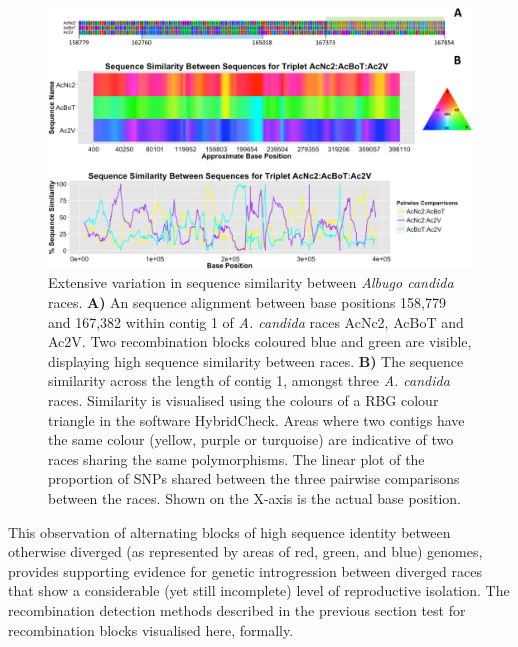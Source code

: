 \begin{figure}
\includegraphics{Figures/AlbugoCandida/AC_Figure2}
\caption{Extensive variation in sequence similarity between \textit{Albugo candida} races.
\textbf{A)} An sequence alignment between base positions 158,779 and 167,382 within contig 1 of \textit{A. candida} races AcNc2, AcBoT and Ac2V. Two recombination blocks coloured blue and green are visible, displaying high sequence similarity between races.
\textbf{B)} The sequence similarity across the length of contig 1, amongst three \textit{A. candida} races. Similarity is visualised using the colours of a RBG colour triangle in the software HybridCheck. Areas where two contigs have the same colour (yellow, purple or turquoise) are indicative of two races sharing the same polymorphisms. The linear plot of the proportion of SNPs shared between the three pairwise comparisons between the races. Shown on the X-axis is the actual base position.\label{fig:AC_Res_2}}
\end{figure}

This observation of alternating blocks of high sequence identity between otherwise diverged (as represented by areas of red, green, and blue) genomes, provides supporting evidence for genetic introgression between diverged races that show a considerable (yet still incomplete) level of reproductive isolation. The recombination detection methods described in the previous section test for recombination blocks visualised here, formally.

